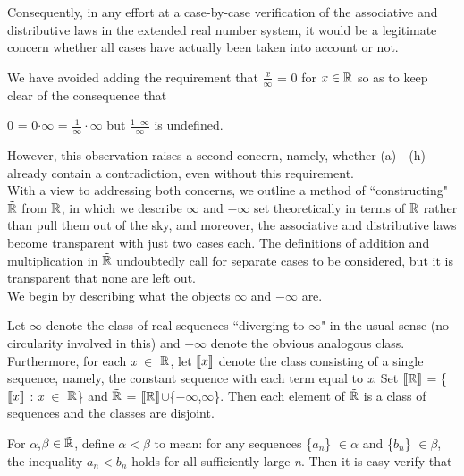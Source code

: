 \documentclass{article}
\begin{document}
Consequently, in any effort at a case-by-case verification of the
associative and distributive laws in the
extended real number system, it would be a legitimate concern
whether all cases have actually been taken into account or not.

We have avoided adding the requirement that $\frac{x}{\infty}$ = 0 for $x
\in\bf {\mathbb R}$ so as to keep clear of the consequence
that

\begin{center} 0 = 0$\cdot\infty$ =
$\frac{1}{\infty}\cdot\infty$ but $\frac{1\cdot\infty}{\infty}$ is
undefined.\end{center}


\noindent However, this observation raises a second concern, namely, whether (a)---(h) already contain a contradiction, even without this requirement.\\



With a view to addressing both concerns, we outline a method of
``constructing" $\tilde{{\bf {\mathbb R}}}$ from ${\bf {\mathbb
R}}$, in which we describe $\infty$ and $-\infty $ set
theoretically in terms of ${\bf {\mathbb R}}$ rather than pull them out
of the sky, and moreover, the associative and distributive laws
become transparent with just two cases each. The definitions of addition and multiplication in $\tilde{{\bf
{\mathbb R}}}$ undoubtedly call for separate cases to be
considered, but it is transparent that none are left out.\\


We begin by describing what the objects $\infty$ and
$-\infty $ are.

Let $\infty$ denote the class of real sequences ``diverging to $\infty$" in the usual sense (no circularity involved in this) and $-\infty $ denote the obvious analogous class. Furthermore, for each \textit{x} $\in$ ${\bf {\mathbb R}}$, let $\left[\kern-0.15em\left[x\right]\kern-0.15em\right]$ denote the class consisting of a single sequence, namely, the constant sequence with each term equal to \textit{x}. Set $\left[\kern-0.15em\left[{\bf {\mathbb R}}\right]\kern-0.15em\right]$ = \{$\left[\kern-0.15em\left[x\right]\kern-0.15em\right]$ : \textit{x} $\in$ ${\bf {\mathbb R}}$\} and $\tilde{{\bf {\mathbb R}}}$ = $\left[\kern-0.15em\left[{\bf {\mathbb R}}\right]\kern-0.15em\right]$$\cup $\{$-\infty $,$\infty$\}. Then each element of $\tilde{{\bf {\mathbb R}}}$ is a class of sequences and the classes are disjoint.

For $\alpha$,$\beta\in\tilde{{\bf {\mathbb R}}}$, define $\alpha<\beta$ to mean: for any sequences \{$a_{n}$\} $\in\alpha$ and \{$b_{n}$\} $\in\beta$, the inequality $a_{n}<b_{n}$ holds for all sufficiently large \textit{n}. Then it is easy verify that
\end{document}
